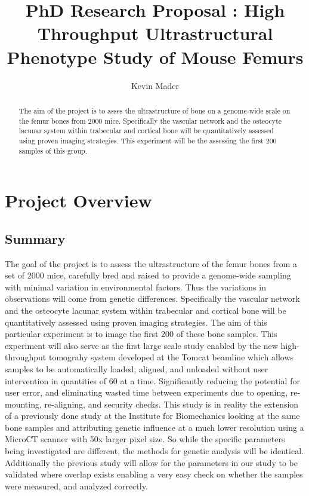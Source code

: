 \documentclass[a4paper,10pt]{article}
\title{PhD Research Proposal : High Throughput Ultrastructural Phenotype Study of Mouse Femurs}
\author{Kevin Mader}
\begin{document}
\maketitle

\begin{abstract}
The aim of the project is to asses the ultrastructure of bone on a genome-wide scale on the femur bones from 2000 mice. Specifically the vascular network and the osteocyte lacunar system within trabecular and cortical bone will be quantitatively assessed using proven imaging strategies. This experiment will be the assessing the first 200 samples of this group.
\end{abstract}
\tableofcontents
\newpage


\section{Project Overview}
\subsection{Summary}
The goal of the project is to assess the ultrastructure of the femur bones from a set of 2000 mice, carefully bred and raised to provide a genome-wide sampling with minimal variation in environmental factors. Thus the variations in observations will come from genetic differences. Specifically the vascular network and the osteocyte lacunar system within trabecular and cortical bone will be quantitatively assessed using proven imaging strategies. The aim of this particular experiment is to image the first 200 of these bone samples. This experiment will also serve as the first large scale study enabled by the new high-throughput tomograhy system developed at the Tomcat beamline which allows samples to be automatically loaded, aligned, and unloaded without user intervention in quantities of 60 at a time. Significantly reducing the potential for user error, and eliminating wasted time between experiments due to opening, re-mounting, re-aligning, and security checks. This study is in reality the extension of a previously done study at the Institute for Biomechanics looking at the same bone samples and attributing genetic influence at a much lower resolution using a MicroCT scanner with 50x larger pixel size. So while the specific parameters being investigated are different, the methods for genetic analysis will be identical. Additionally the previous study will allow for the parameters in our study to be validated where overlap exists enabling a very easy check on whether the samples were measured, and analyzed correctly. 
\end{document}
